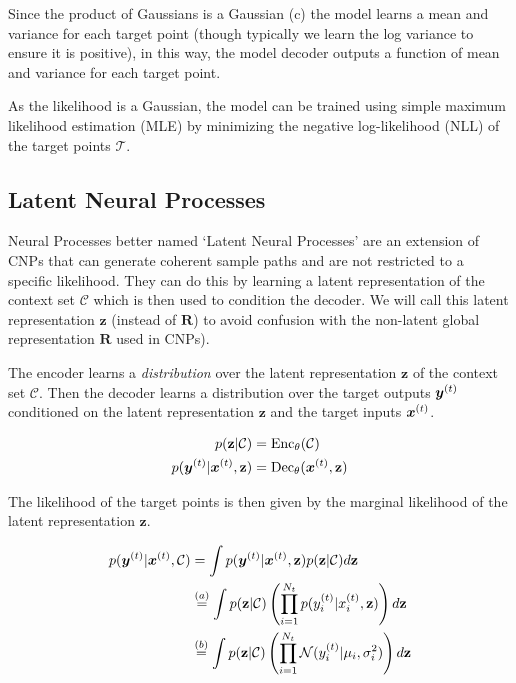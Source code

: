 \documentclass[main.tex]{subfiles}
\begin{document}
Since the product of Gaussians is a Gaussian (c) the model learns a mean and variance for each target point (though typically we learn the log variance to ensure it is positive), in this way, the model decoder outputs a function of mean and variance for each target point.

As the likelihood is a Gaussian, the model can be trained using simple maximum likelihood estimation (MLE) by minimizing the negative log-likelihood (NLL) of the target points $\mathcal{T}$. 


\subsection{Latent Neural Processes}

Neural Processes better named `Latent Neural Processes' are an extension of CNPs that can generate coherent sample paths and are not restricted to a specific likelihood. They can do this by learning a latent representation of the context set $\mathcal{C}$ which is then used to condition the decoder. We will call this latent representation $\mathbf{z}$ (instead of $\bm{R}$) to avoid confusion with the non-latent global representation $\bm{R}$ used in CNPs).

The encoder learns a \emph{distribution} over the latent representation $\mathbf{z}$ of the context set $\mathcal{C}$. Then the decoder learns a distribution over the target outputs $\bm{y}^{(t)}$ conditioned on the latent representation $\mathbf{z}$ and the target inputs $\bm{x}^{(t)}$.

\begin{align*}
    p(\mathbf{z} | \mathcal{C}) &= \text{Enc}_\theta(\mathcal{C})\\ p(\bm{y}^{(t)} | \bm{x}^{(t)}, \mathbf{z}) &= \text{Dec}_\theta(\bm{x}^{(t)}, \mathbf{z})
\end{align*}

The likelihood of the target points is then given by the marginal likelihood of the latent representation $\mathbf{z}$.

\begin{align}
    p(\bm{y}^{(t)} | \bm{x}^{(t)}, \mathcal{C}) &= \int p(\bm{y}^{(t)} | \bm{x}^{(t)}, \mathbf{z}) p(\mathbf{z} | \mathcal{C}) d\mathbf{z}
    \\ &\stackrel{(a)}{=} \int p(\mathbf{z} | \mathcal{C}) \left(\prod_{i=1}^{N_t} p({y}_i^{(t)} | {x}_i^{(t)}, \mathbf{z})\right)  d\mathbf{z}
    \\ &\stackrel{(b)}{=} \int p(\mathbf{z} | \mathcal{C}) \left(\prod_{i=1}^{N_t} \mathcal{N}({y}_i^{(t)} | \mu_i, \sigma_i^2)\right)  d\mathbf{z}
\end{align}
\end{document}
